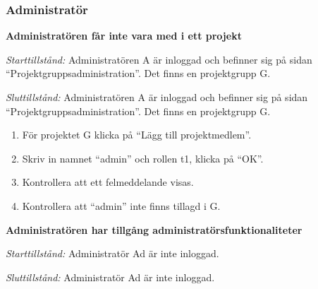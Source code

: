 \documentclass[a4paper]{article}
\begin{document}
\subsubsection{Administratör}
\begin{FT}
\item \textbf{Administratören får inte vara med i ett projekt}

\emph{Starttillstånd:} Administratören A är inloggad och befinner sig på sidan ``Projektgruppsadministration''. Det finns en projektgrupp G.

\emph{Sluttillstånd:} Administratören A är inloggad och befinner sig på sidan ``Projektgruppsadministration''. Det finns en projektgrupp G.

\begin{enumerate}
\item För projektet G klicka på ``Lägg till projektmedlem''.
\item Skriv in namnet ``admin'' och rollen t1, klicka på ``OK''.
\item Kontrollera att ett felmeddelande visas.
\item Kontrollera att ``admin'' inte finns tillagd i G.
\end{enumerate}

\item \textbf{Administratören har tillgång administratörsfunktionaliteter} 

\emph{Starttillstånd:} Administratör Ad är inte inloggad.

\emph{Sluttillstånd:} Administratör Ad är inte inloggad.

\begin{enumerate}


\end{enumerate}
\end{FT}
\end{document}
